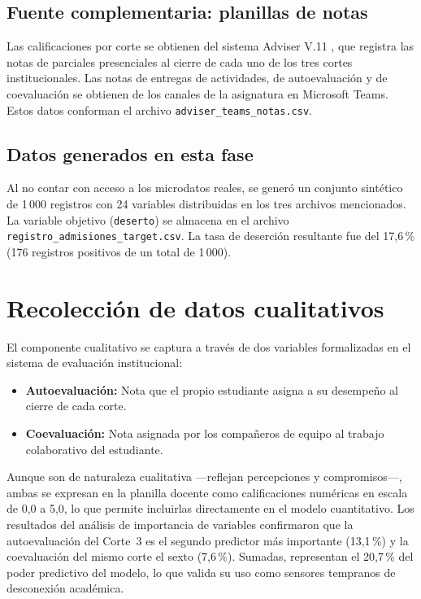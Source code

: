 \documentclass[12pt,letterpaper]{article}
\begin{document}
\subsection*{Fuente complementaria: planillas de notas}

Las calificaciones por corte se obtienen del sistema Adviser V.11 \parencite{bersoft2024}, que registra las notas de parciales presenciales al cierre de cada uno de los tres cortes institucionales. Las notas de entregas de actividades, de autoevaluación y de coevaluación se obtienen de los canales de la asignatura en Microsoft Teams. Estos datos conforman el archivo \texttt{adviser\_teams\_notas.csv}.

\subsection*{Datos generados en esta fase}

Al no contar con acceso a los microdatos reales, se generó un conjunto sintético de 1\,000 registros con 24 variables distribuidas en los tres archivos mencionados. La variable objetivo (\texttt{deserto}) se almacena en el archivo \texttt{registro\_admisiones\_target.csv}. La tasa de deserción resultante fue del 17,6\,\% (176 registros positivos de un total de 1\,000).

\section{Recolección de datos cualitativos}

El componente cualitativo se captura a través de dos variables formalizadas en el sistema de evaluación institucional:

\begin{itemize}
  \item \textbf{Autoevaluación:} Nota que el propio estudiante asigna a su desempeño al cierre de cada corte.
  \item \textbf{Coevaluación:} Nota asignada por los compañeros de equipo al trabajo colaborativo del estudiante.
\end{itemize}

Aunque son de naturaleza cualitativa —reflejan percepciones y compromisos—, ambas se expresan en la planilla docente como calificaciones numéricas en escala de 0,0 a 5,0, lo que permite incluirlas directamente en el modelo cuantitativo. Los resultados del análisis de importancia de variables confirmaron que la autoevaluación del Corte~3 es el segundo predictor más importante (13,1\,\%) y la coevaluación del mismo corte el sexto (7,6\,\%). Sumadas, representan el 20,7\,\% del poder predictivo del modelo, lo que valida su uso como sensores tempranos de desconexión académica.
\end{document}
